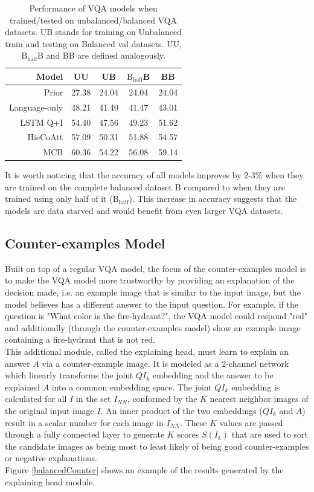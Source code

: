 \documentclass{article}
\begin{document}
    \begin{table}[ht]
    	\centering
    	\begin{tabular}{rcccc}
    		\toprule
    		Model & UU & UB &  $\text{B}_{\text{half}}$B & BB\\
    		\midrule
            Prior  & 27.38 & 24.04 & 24.04 & 24.04\\
            Language-only & 48.21 & 41.40 & 41.47 & 43.01\\
            LSTM Q+I \citep{iccvAntol15} & 54.40 & 47.56 & 49.23 & 51.62\\
            HieCoAtt \citep{nipsLu16} & 57.09 & 50.31 & 51.88 & 54.57\\
            MCB \citep{corrFukui16} & 60.36 & 54.22 & 56.08 & 59.14\\
    		\bottomrule
    	\end{tabular}
    	\caption{Performance of VQA models when trained/tested on unbalanced/balanced VQA datasets. UB stands for training on Unbalanced train and testing on Balanced val datasets. UU, $\text{B}_{\text{half}}$B and BB are defined analogously.}
        \label{vqa2}
    \end{table}

It is worth noticing that the accuracy of all models improves by 2-3\% when they are trained on the complete balanced dataset B compared to when they are trained using only half of it ($\text{B}_{\text{half}}$). This increase in accuracy suggests that the models are data starved and would benefit from even larger VQA datasets.
\subsection{Counter-examples Model}
Built on top of a regular VQA model, the focus of the counter-examples model is to make the VQA model more trustworthy by providing an explanation of the decision made, i.e. an example image that is similar to the input image, but the model believes has a different answer to the input question. For example, if the question is "What color is the fire-hydrant?", the VQA model could respond "red" and additionally (through the counter-examples model) show an example image containing a fire-hydrant that is not red.\\
This additional module, called the explaining head, must learn to explain an answer $A$ via a counter-example image. It is modeled as a 2-channel network which linearly transforms the joint $QI_k$ embedding and the answer to be explained $A$ into a common embedding space. The joint $QI_k$ embedding is calculated for all $I$ in the set $I_{NN}$, conformed by the $K$ nearest neighbor images of the original input image $I$. An inner product of the two embeddings ($QI_k$ and $A$) result in a scalar number for each image in $I_{NN}$. These $K$ values are passed through a fully connected layer to generate $K$ scores $S(I_k)$ that are used to sort the candidate images as being most to least likely of being good counter-examples or negative explanations.\\
Figure \ref{balancedCounter} shows an example of the results generated by the explaining head module.
\end{document}
